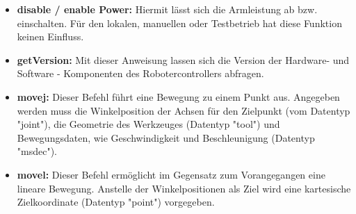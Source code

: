\documentclass[ a4paper,
                oneside,
                toc=bibliography,
                toc=listof
                ]{scrbook}
\begin{document}
   	\begin{itemize}
   		\item \textbf{disable / enable Power:} Hiermit lässt sich die Armleistung ab bzw. einschalten. Für den lokalen, manuellen oder Testbetrieb hat diese Funktion keinen Einfluss.
   		\item \textbf{getVersion:} Mit dieser Anweisung lassen sich die Version der Hardware- und Software - Komponenten des Robotercontrollers abfragen.
   		\item \textbf{movej:} Dieser Befehl führt eine Bewegung zu einem Punkt aus. Angegeben werden muss die Winkelposition der Achsen für den Zielpunkt (vom Datentyp "joint"), die Geometrie des Werkzeuges (Datentyp "tool") und Bewegungsdaten, wie Geschwindigkeit und Beschleunigung (Datentyp "msdec").
   		\item \textbf{movel:} Dieser Befehl ermöglicht im Gegensatz zum Vorangegangen eine lineare Bewegung. Anstelle der Winkelpositionen als Ziel wird eine kartesische Zielkoordinate (Datentyp "point") vorgegeben.  \\
   	\end{itemize}
\end{document}
